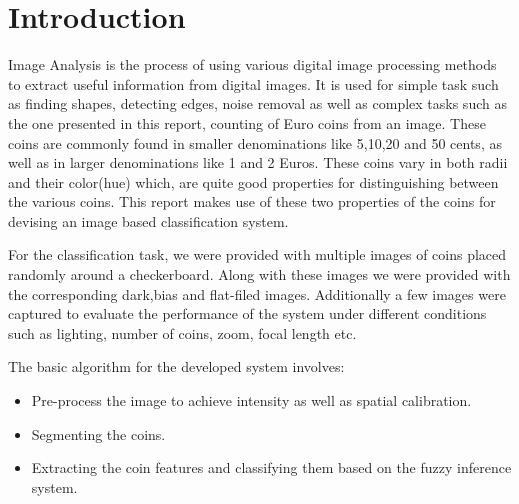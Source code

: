 \documentclass[report.tex]{subfile}
\begin{document}
\section{Introduction}

Image Analysis is the process of using various digital image processing methods
to extract useful information from digital images. It is used for simple task
such as finding shapes, detecting edges, noise removal as well as complex tasks
such as the one presented in this report, counting of Euro coins from an image.
These coins are commonly found in smaller denominations like 5,10,20 and 50
cents, as well as in larger denominations like 1 and 2 Euros. These coins vary
in both radii and their color(hue) which, are quite good properties for
distinguishing between the various coins. This report makes use of these two
properties of the coins for devising an image based classification system.

For the classification task, we were provided with multiple images of coins
placed randomly around a checkerboard. Along with these images we were provided
with the corresponding dark,bias and flat-filed images. Additionally a few
images were captured to evaluate the performance of the system under different
conditions such as lighting, number of coins, zoom, focal length etc.

The basic algorithm for the developed system involves:
\begin{itemize}
  \item Pre-process the image to achieve intensity as well as spatial
      calibration.
  \item Segmenting the coins.
  \item Extracting the coin features and classifying them based on the fuzzy
      inference system.
\end{itemize}
\end{document}
